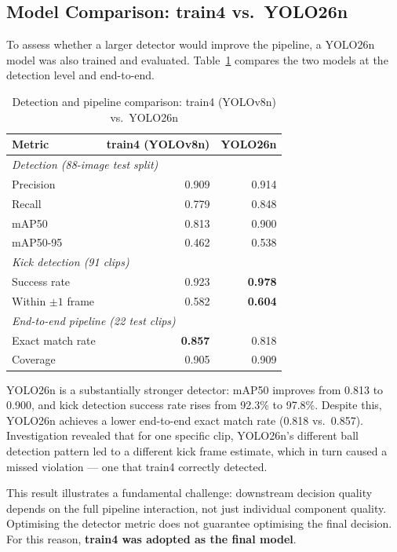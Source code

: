\documentclass[12pt,a4paper,twoside]{article}
\begin{document}
\subsection{Model Comparison: train4 vs.\ YOLO26n}

To assess whether a larger detector would improve the pipeline, a YOLO26n model
was also trained and evaluated. Table~\ref{tab:model_comparison} compares the
two models at the detection level and end-to-end.

\begin{table}[H]
  \centering
  \caption{Detection and pipeline comparison: train4 (YOLOv8n) vs.\ YOLO26n}
  \label{tab:model_comparison}
  \begin{tabular}{lrr}
    \toprule
    Metric & train4 (YOLOv8n) & YOLO26n \\
    \midrule
    \multicolumn{3}{l}{\textit{Detection (88-image test split)}} \\
    \quad Precision & 0.909 & 0.914 \\
    \quad Recall    & 0.779 & 0.848 \\
    \quad mAP50     & 0.813 & 0.900 \\
    \quad mAP50-95  & 0.462 & 0.538 \\
    \midrule
    \multicolumn{3}{l}{\textit{Kick detection (91 clips)}} \\
    \quad Success rate & 0.923 & \textbf{0.978} \\
    \quad Within $\pm 1$ frame & 0.582 & \textbf{0.604} \\
    \midrule
    \multicolumn{3}{l}{\textit{End-to-end pipeline (22 test clips)}} \\
    \quad Exact match rate & \textbf{0.857} & 0.818 \\
    \quad Coverage & 0.905 & 0.909 \\
    \bottomrule
  \end{tabular}
\end{table}

YOLO26n is a substantially stronger detector: mAP50 improves from 0.813 to 0.900,
and kick detection success rate rises from 92.3\% to 97.8\%. Despite this,
YOLO26n achieves a lower end-to-end exact match rate (0.818 vs.\ 0.857).
Investigation revealed that for one specific clip, YOLO26n's different ball
detection pattern led to a different kick frame estimate, which in turn caused
a missed violation — one that train4 correctly detected.

This result illustrates a fundamental challenge: downstream decision quality
depends on the full pipeline interaction, not just individual component quality.
Optimising the detector metric does not guarantee optimising the final decision.
For this reason, \textbf{train4 was adopted as the final model}.
\end{document}
